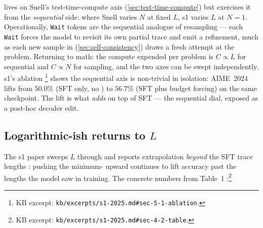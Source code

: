 \begin{intuition}
 lives on Snell's test-time-compute axis
(\cref{sec:test-time-compute}) but exercises it from the
\emph{sequential} side: where Snell varies $N$ at fixed $L$, s1 varies
$L$ at $N = 1$. Operationally, \texttt{Wait} tokens are the
sequential analogue of resampling --- each \texttt{Wait} forces the
model to revisit its own partial trace and emit a refinement, much as
each new sample in  (\cref{sec:self-consistency})
draws a fresh attempt at the problem. Returning to math: the compute
expended per problem is $C \propto L$ for sequential and $C \propto N$
for sampling, and the two axes can be swept independently. s1's
ablation \citep[\S 5.1]{s1-2025}\footnote{KB excerpt:
\texttt{kb/excerpts/s1-2025.md\#sec-5-1-ablation}.} shows the
sequential axis is non-trivial in isolation: AIME~2024 lifts from
$50.0\%$ (SFT only, no ) to $56.7\%$ (SFT plus budget
forcing) on the same checkpoint. The lift is what 
\emph{adds} on top of SFT --- the sequential  dial, exposed as a
post-hoc decoder edit.
\end{intuition}

\subsection{Logarithmic-ish returns to $L$}
\label{sec:log-returns}

The s1 paper sweeps $L$ through  and reports
extrapolation \emph{beyond} the SFT trace lengths
\citep[abstract, \S 4.2]{s1-2025}: pushing the minimum-
upward continues to lift accuracy past the lengths the model saw in
training. The concrete numbers from
Table~1 \citep[\S 4.2]{s1-2025}:\footnote{KB excerpt:
\texttt{kb/excerpts/s1-2025.md\#sec-4-2-table}.}

